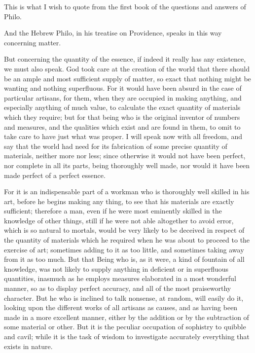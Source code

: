 This is what I wish to quote from the first book of the questions and answers of Philo.

And the Hebrew Philo, in his treatise on Providence, speaks in this way concerning matter.

But concerning the quantity of the essence, if indeed it really has any existence, we must also
speak. God took care at the creation of the world that there should be an ample and most sufficient
supply of matter, so exact that nothing might be wanting and nothing superfluous. For it would have
been absurd in the case of particular artisans, for them, when they are occupied in making
anything, and especially anything of much value, to calculate the exact quantity of materials which
they require; but for that being who is the original inventor of numbers and measures, and the
qualities which exist and are found in them, to omit to take care to have just what was proper. I will
speak now with all freedom, and say that the world had need for its fabrication of some precise
quantity of materials, neither more nor less; since otherwise it would not have been perfect, nor
complete in all its parts, being thoroughly well made, nor would it have been made perfect of a
perfect essence.

For it is an indispensable part of a workman who is thoroughly well skilled in his art, before he
begins making any thing, to see that his materials are exactly sufficient; therefore a man, even if
he were most eminently skilled in the knowledge of other things, still if he were not able altogether
to avoid error, which is so natural to mortals, would be very likely to be deceived in respect of the
quantity of materials which he required when he was about to proceed to the exercise of art;
sometimes adding to it as too little, and sometimes taking away from it as too much. But that Being
who is, as it were, a kind of fountain of all knowledge, was not likely to supply anything in deficient
or in superfluous quantities, inasmuch as he employs measures elaborated in a most wonderful
manner, so as to display perfect accuracy, and all of the most praiseworthy character. But he who
is inclined to talk nonsense, at random, will easily do it, looking upon the different works of all
artisans as causes, and as having been made in a more excellent manner, either by the addition or
by the subtraction of some material or other. But it is the peculiar occupation of sophistry to quibble
and cavil; while it is the task of wisdom to investigate accurately everything that exists in nature.

